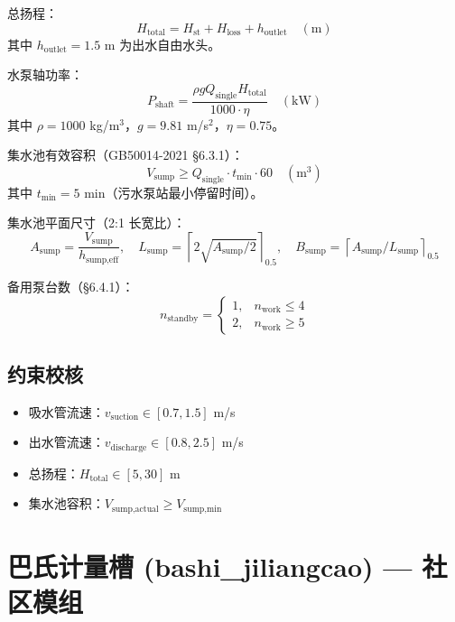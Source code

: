 \documentclass[12pt,a4paper]{ctexart}
\begin{document}
总扬程：
\begin{equation}
H_{\text{total}} = H_{\text{st}} + H_{\text{loss}} + h_{\text{outlet}} \quad (\text{m})
\end{equation}
其中 $h_{\text{outlet}} = 1.5$ m 为出水自由水头。

水泵轴功率：
\begin{equation}
P_{\text{shaft}} = \frac{\rho g Q_{\text{single}} H_{\text{total}}}{1000 \cdot \eta} \quad (\text{kW})
\end{equation}
其中 $\rho = 1000$ kg/m$^3$，$g = 9.81$ m/s$^2$，$\eta = 0.75$。

集水池有效容积（GB50014-2021 §6.3.1）：
\begin{equation}
V_{\text{sump}} \ge Q_{\text{single}} \cdot t_{\text{min}} \cdot 60 \quad (\text{m}^3)
\end{equation}
其中 $t_{\text{min}} = 5$ min（污水泵站最小停留时间）。

集水池平面尺寸（2:1 长宽比）：
\begin{equation}
A_{\text{sump}} = \frac{V_{\text{sump}}}{h_{\text{sump,eff}}}, \quad
L_{\text{sump}} = \left\lceil 2\sqrt{A_{\text{sump}}/2} \right\rceil_{0.5}, \quad
B_{\text{sump}} = \left\lceil A_{\text{sump}}/L_{\text{sump}} \right\rceil_{0.5}
\end{equation}

备用泵台数（§6.4.1）：
\begin{equation}
n_{\text{standby}} = \begin{cases}
1, & n_{\text{work}} \le 4 \\
2, & n_{\text{work}} \ge 5
\end{cases}
\end{equation}

\subsection{约束校核}
\begin{itemize}
  \item 吸水管流速：$v_{\text{suction}} \in [0.7, 1.5]$ m/s
  \item 出水管流速：$v_{\text{discharge}} \in [0.8, 2.5]$ m/s
  \item 总扬程：$H_{\text{total}} \in [5, 30]$ m
  \item 集水池容积：$V_{\text{sump,actual}} \ge V_{\text{sump,min}}$
\end{itemize}

\section{巴氏计量槽 (bashi\_jiliangcao) — 社区模组}
\end{document}
